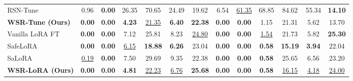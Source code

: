 \documentclass{article}
\begin{document}
\begin{table}[t]
{\begin{tabular}{lcccccc|cccccc}
RSN-Tune
& 0.96 & \textbf{0.00} & 26.35 & 70.65 & 24.49 & 19.62
& 6.54 & \uline{61.35} & 68.85 & 84.62 & 55.34 & \textbf{14.10} \\

\textbf{WSR-Tune (Ours)}
& \textbf{0.00} & \textbf{0.00} & \textbf{4.23} & \uline{21.35} & \textbf{6.40} & \textbf{22.38}
& \textbf{0.00} & \textbf{0.00} & 1.15 & 21.31 & 5.62 & 13.70 \\

\midrule

Vanilla LoRA FT
& \textbf{0.00} & \textbf{0.00} & 7.12 & 25.81 & 8.23 & \uline{24.80}
& \textbf{0.00} & \textbf{0.00} & \uline{1.54} & 21.73 & 5.82 & \textbf{25.30} \\

SafeLoRA
& \textbf{0.00} & \textbf{0.00} & \uline{6.15} & \textbf{18.88} & \textbf{6.26} & 23.04
& \textbf{0.00} & \textbf{0.00} & \textbf{0.58} & \textbf{15.19} & \textbf{3.94} & 22.04 \\

SaLoRA
& \uline{0.19} & \textbf{0.00} & 7.50 & 29.69 & 9.35 & 22.38
& \textbf{0.00} & \textbf{0.00} & \textbf{0.58} & 25.65 & 6.56 & 23.20 \\

\textbf{WSR-LoRA (Ours)}
& \textbf{0.00} & \textbf{0.00} & \textbf{4.81} & \uline{22.23} & \uline{6.76} & \textbf{25.68}
& \textbf{0.00} & \textbf{0.00} & \textbf{0.58} & \uline{16.15} & \uline{4.18} & \uline{24.00} \\

\bottomrule
\end{tabular}
}
\end{table}
\end{document}
